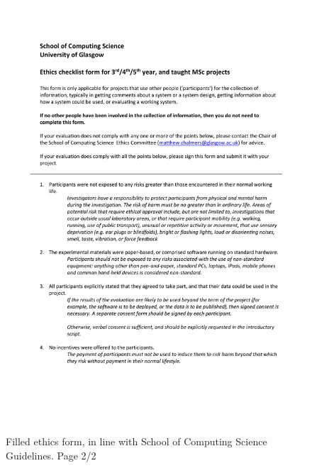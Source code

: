 \documentclass{l4proj}
\begin{document}
\begin{appendices}
\begin{figure}[htbp]
    \includegraphics[page=2,width=1\linewidth]{appendix/Project_Ethics_checklist_signed.pdf}   
    \caption{Filled ethics form, in line with School of Computing Science Guidelines. Page 2/2}
\end{figure}
\newpage


\end{appendices}
\end{document}
